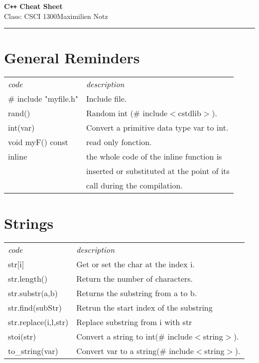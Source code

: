 \documentclass[5pt]{article}
\begin{document}
\begin{center}
     \Large{\textbf{C\texttt{++} Cheat Sheet}}\\
     \small{Class: CSCI 1300}\hfill\small{\textcopyright Maximilien Notz \the\year{}}
     \noindent\rule{20cm}{0.4pt}
\end{center}
\begin{multicols}{2}
\setcounter{secnumdepth}{0}


\section{General Reminders}
\begin{tabular}{ll}
\emph{code}             & \emph{description}\\
\# include "myfile.h"   & Include file.\\
rand()                  & Random int (\# include$<$cstdlib$>$).\\
int(var)                & Convert a primitive data type var to int.\\
void myF() const        & read only fonction.\\
inline                  & the whole code of the inline function is\\
                        & inserted or substituted at the point of its\\
                        & call during the compilation.\\
\end{tabular}


\section{Strings}
\begin{tabular}{ll}
\emph{code}         & \emph{description}\\
str$[$i$]$          & Get or set the char at the index i.\\
str.length()        & Return the number of characters.\\
str.substr(a,b)     & Returns the substring from a to b.\\
str.find(subStr)    & Retrun the start index of the substring\\
str.replace(i,l,str)& Replace substring from i with str\\
stoi(str)           & Convert a string to int(\# include$<$string$>$).\\
to\_string(var)     & Convert var to a string(\# include$<$string$>$).\\
\end{tabular}


\end{multicols}
\end{document}

